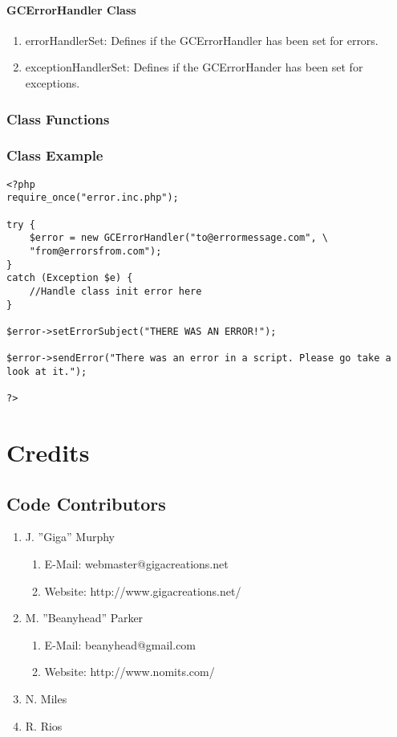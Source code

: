 \documentclass{article}
\begin{document}
\paragraph{GCErrorHandler Class}
\begin{enumerate}
\item errorHandlerSet: Defines if the GCErrorHandler has been set for errors.
\item exceptionHandlerSet: Defines if the GCErrorHander has been set for exceptions.
\end{enumerate}
\subsubsection{Class Functions}

\newpage

\subsubsection{Class Example}
\begin{lstlisting}
<?php
require_once("error.inc.php");

try {
	$error = new GCErrorHandler("to@errormessage.com", \ 
	"from@errorsfrom.com");
}
catch (Exception $e) {
	//Handle class init error here
}

$error->setErrorSubject("THERE WAS AN ERROR!");

$error->sendError("There was an error in a script. Please go take a look at it.");

?>
\end{lstlisting}

\newpage

\section{Credits}
\subsection{Code Contributors}
\begin{enumerate}
\item J. ''Giga'' Murphy
\begin{enumerate}
\item E-Mail: webmaster@gigacreations.net
\item Website: http://www.gigacreations.net/
\end{enumerate}
\item M. ''Beanyhead'' Parker
\begin{enumerate}
\item E-Mail: beanyhead@gmail.com
\item Website: http://www.nomits.com/
\end{enumerate}
\item N. Miles
\item R. Rios
\end{enumerate}
\end{document}
